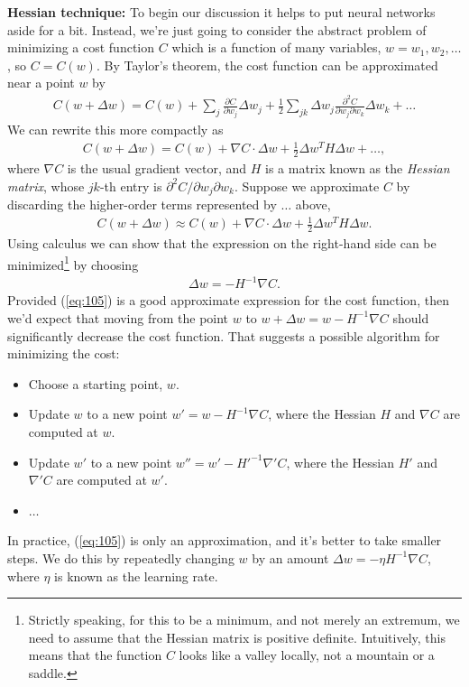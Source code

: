 \documentclass[a4paper,twoside,10pt]{book}
\begin{document}
\textbf{Hessian technique:} To begin our discussion it helps to put neural networks aside for a bit. Instead, we're just going to consider the abstract problem of minimizing a cost function $C$ which is a function of many variables, $w=w_1,w_2,\ldots$, so $C=C(w)$. By Taylor's theorem, the cost function can be approximated near a point $w$ by
\begin{eqnarray}
C(w+\Delta w)  =  C(w) + \sum_j \frac{\partial C}{\partial w_j} \Delta w_j + \frac{1}{2} \sum_{jk} \Delta w_j \frac{\partial^2 C}{\partial w_j \partial w_k} \Delta w_k + \ldots
\label{eq:103}
\end{eqnarray}
We can rewrite this more compactly as
\begin{eqnarray}
C(w+\Delta w) = C(w) + \nabla C \cdot \Delta w + \frac{1}{2} \Delta w^T H \Delta w + \ldots,
\label{eq:104}
\end{eqnarray}
where $\nabla C$ is the usual gradient vector, and $H$ is a matrix known as the \textit{Hessian matrix}, whose $jk$-th entry is $\partial^2C / \partial w_j \partial w_k$. Suppose we approximate $C$ by discarding the higher-order terms represented by $\ldots$ above,
\begin{eqnarray} 
C(w+\Delta w) \approx C(w) + \nabla C \cdot \Delta w + \frac{1}{2} \Delta w^T H \Delta w.
\label{eq:105}
\end{eqnarray}
Using calculus we can show that the expression on the right-hand side can be minimized\footnote{Strictly speaking, for this to be a minimum, and not merely an extremum, we need to assume that the Hessian matrix is positive definite. Intuitively, this means that the function $C$ looks like a valley locally, not a mountain or a saddle.} by choosing
\begin{eqnarray}
\Delta w = -H^{-1} \nabla C.
\label{eq:106}
\end{eqnarray}
Provided (\ref{eq:105}) is a good approximate expression for the cost function, then we'd expect that moving from the point $w$ to $w+\Delta w = w-H^{-1} \nabla C$ should significantly decrease the cost function. That suggests a possible algorithm for minimizing the cost:
\begin{itemize}
\item Choose a starting point, $w$.
\item Update $w$ to a new point $w' = w-H^{-1} \nabla C$, where the Hessian $H$ and $\nabla C$ are computed at $w$.
\item Update $w'$ to a new point $w''=w'-H'^{-1}\nabla'C$, where the Hessian $H'$ and $\nabla'C$ are computed at $w'$.
\item $\ldots$
\end{itemize}
In practice, (\ref{eq:105}) is only an approximation, and it's better to take smaller steps. We do this by repeatedly changing $w$ by an amount $\Delta w = -\eta H^{-1}\nabla C$, where $\eta$ is known as the learning rate.
\end{document}
